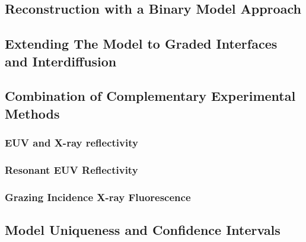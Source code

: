 \subsection{Reconstruction with a Binary Model Approach}

\subsection{Extending The Model to Graded Interfaces and Interdiffusion}

\subsection{Combination of Complementary Experimental Methods}
\subsubsection{EUV and X-ray reflectivity}
\subsubsection{Resonant EUV Reflectivity}
\subsubsection{Grazing Incidence X-ray Fluorescence}

\subsection{Model Uniqueness and Confidence Intervals}
\cite{haase_multiparameter_2016}


